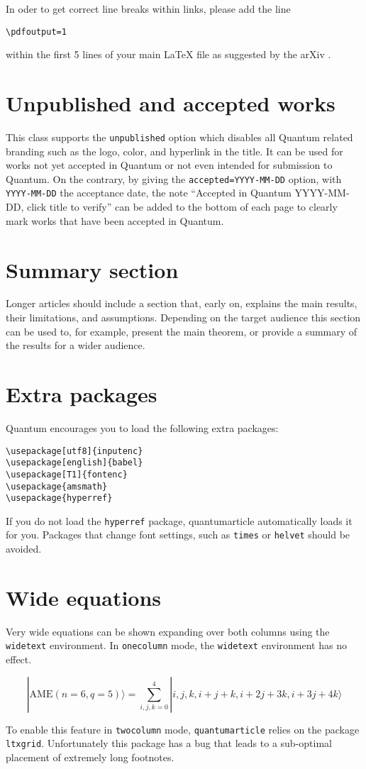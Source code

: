 \documentclass[a4paper,twocolumn,superscriptaddress,11pt,accepted=2017-05-09]{quantumarticle}
\begin{document}
In oder to get correct line breaks within links, please add the line 
\begin{verbatim}
\pdfoutput=1
\end{verbatim}
within the first 5 lines of your main LaTeX file as suggested by the arXiv \cite{arxivpdfoutput}.

\section{Unpublished and accepted works}
This class supports the \texttt{unpublished} option which disables all Quantum related branding such as the logo, color, and hyperlink in the title.
It can be used for works not yet accepted in Quantum or not even intended for submission to Quantum.
On the contrary, by giving the \texttt{accepted=YYYY-MM-DD} option, with \texttt{YYYY-MM-DD} the acceptance date, the note ``Accepted in Quantum YYYY-MM-DD, click title to verify'' can be added to the bottom of each page to clearly mark works that have been accepted in Quantum. 

\section{Summary section}
Longer articles should include a section that, early on, explains the main results, their limitations, and assumptions.
Depending on the target audience this section can be used to, for example, present the main theorem, or provide a summary of the results for a wider audience.

\section{Extra packages}
Quantum encourages you to load the following extra packages:
\begin{verbatim}
\usepackage[utf8]{inputenc}
\usepackage[english]{babel}
\usepackage[T1]{fontenc}
\usepackage{amsmath}
\usepackage{hyperref}
\end{verbatim}
If you do not load the \texttt{hyperref} package, quantumarticle automatically loads it for you.
Packages that change font settings, such as \texttt{times} or \texttt{helvet} should be avoided.

\section{Wide equations}
Very wide equations can be shown expanding over both columns using the \texttt{widetext} environment.
In \texttt{onecolumn} mode, the \texttt{widetext} environment has no effect.
\begin{widetext}
  \begin{equation}
|\mathrm{AME}(n=6,q=5)\rangle=\sum_{i,j,k=0}^4 |i,j,k,i+j+k,i+2j+3k,i+3j+4k\rangle
  \end{equation}
\end{widetext}
To enable this feature in \texttt{twocolumn} mode, \texttt{quantumarticle} relies on the package \texttt{ltxgrid}.
Unfortunately this package has a bug that leads to a sub-optimal placement of extremely long footnotes.
\end{document}
